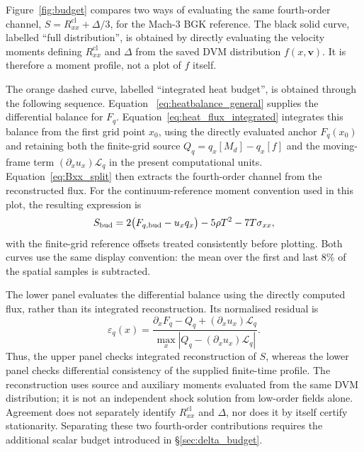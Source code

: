 \documentclass[lineno,paper]{JFM-FLM_Au}
\newenvironment{revision}{\nolinenumbers\begin{tcolorbox}[breakable,colback=revisionyellow,colframe=revisionyellow,boxrule=0pt,arc=0pt,left=5pt,right=5pt,top=5pt,bottom=5pt,before skip=6pt,after skip=6pt]\captionsetup{width=\linewidth}}{\end{tcolorbox}\linenumbers}
\newenvironment{revision}{}{}
\newcommand{\cl}{\mathrm{cl}}
\begin{document}
\begin{revision}
Figure~\ref{fig:budget} compares two ways of evaluating the
same fourth-order channel, $S=R^{\cl}_{xx}+\Delta/3$, for the
Mach-3 BGK reference. The black solid curve, labelled
``full distribution'', is obtained by directly evaluating
the velocity moments defining $R^{\cl}_{xx}$ and $\Delta$
from the saved DVM distribution $f(x,\boldsymbol v)$.
It is therefore a moment profile, not a plot of $f$ itself.

The orange dashed curve, labelled ``integrated heat budget'',
is obtained through the following sequence. Equation~%
\eqref{eq:heatbalance_general} supplies the differential
balance for $F_q$. Equation~\eqref{eq:heat_flux_integrated}
integrates this balance from the first grid point $x_0$,
using the directly evaluated anchor $F_q(x_0)$ and retaining
both the finite-grid source
$Q_q=q_x[M_d]-q_x[f]$ and the moving-frame term
$(\partial_xu_x)\mathcal L_q$ in the present computational
units. Equation~\eqref{eq:Bxx_split} then extracts the
fourth-order channel from the reconstructed flux.
For the continuum-reference moment convention used in
this plot, the resulting expression is
\[
 S_{\rm bud}
 =2\bigl(F_{q,\rm bud}-u_xq_x\bigr)
  -5\rho T^2-7T\sigma_{xx},
\]
with the finite-grid reference offsets treated consistently
before plotting. Both curves use the same display convention:
the mean over the first and last $8\%$ of the spatial samples
is subtracted.

The lower panel evaluates the differential balance using
the directly computed flux, rather than its integrated
reconstruction. Its normalised residual is
\[
 \varepsilon_q(x)=
 \frac{\partial_xF_q-Q_q+
       (\partial_xu_x)\mathcal L_q}
      {\max_x\left|Q_q-(\partial_xu_x)\mathcal L_q\right|}.
\]
Thus, the upper panel checks integrated reconstruction of
$S$, whereas the lower panel checks differential consistency
of the supplied finite-time profile. The reconstruction
uses source and auxiliary moments evaluated from the same
DVM distribution; it is not an independent shock solution
from low-order fields alone. Agreement does not separately
identify $R^{\cl}_{xx}$ and $\Delta$, nor does it by itself
certify stationarity. Separating these two fourth-order
contributions requires the additional scalar budget
introduced in \S\ref{sec:delta_budget}.
\end{revision}
\end{document}
